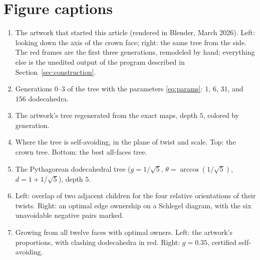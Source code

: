 \documentclass[12pt]{article}
\theoremstyle{plain}
\theoremstyle{remark}
\begin{document}
\section*{Figure captions}
\begin{enumerate}
\item[Figure 1.] The artwork that started this article (rendered in Blender,
  March 2026).  Left: looking down the axis of the crown face; right: the same
  tree from the side.  The red frames are the first three generations,
  remodeled by hand; everything else is the unedited output of the program
  described in Section~\ref{sec:construction}.
\item[Figure 2.] Generations $0$--$3$ of the tree with the parameters
  \eqref{eq:params}: $1$, $6$, $31$, and $156$ dodecahedra.
\item[Figure 3.] The artwork's tree regenerated from the exact maps, depth $5$,
  colored by generation.
\item[Figure 4.] Where the tree is self-avoiding, in the plane of twist and
  scale.  Top: the crown tree.  Bottom: the best all-faces tree.
\item[Figure 5.] The Pythagorean dodecahedral tree ($g=1/\sqrt5$,
  $\theta=\arccos(1/\sqrt5)$, $d=1+1/\sqrt5$), depth $5$.
\item[Figure 6.] Left: overlap of two adjacent children for the four relative
  orientations of their twists.  Right: an optimal edge ownership on a
  Schlegel diagram, with the six unavoidable negative pairs marked.
\item[Figure 7.] Growing from all twelve faces with optimal owners.  Left: the
  artwork's proportions, with clashing dodecahedra in red.  Right: $g=0.35$,
  certified self-avoiding.
\end{enumerate}
\end{document}
